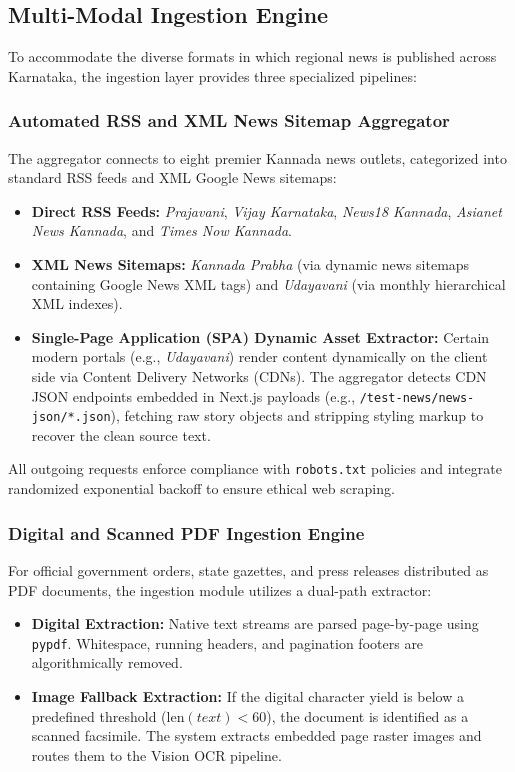 \documentclass[conference]{IEEEtran}
\begin{document}
\subsection{Multi-Modal Ingestion Engine}
To accommodate the diverse formats in which regional news is published across Karnataka, the ingestion layer provides three specialized pipelines:

\subsubsection{Automated RSS and XML News Sitemap Aggregator}
The aggregator connects to eight premier Kannada news outlets, categorized into standard RSS feeds and XML Google News sitemaps:
\begin{itemize}
    \item \textbf{Direct RSS Feeds:} \textit{Prajavani}, \textit{Vijay Karnataka}, \textit{News18 Kannada}, \textit{Asianet News Kannada}, and \textit{Times Now Kannada}.
    \item \textbf{XML News Sitemaps:} \textit{Kannada Prabha} (via dynamic news sitemaps containing Google News XML tags) and \textit{Udayavani} (via monthly hierarchical XML indexes).
    \item \textbf{Single-Page Application (SPA) Dynamic Asset Extractor:} Certain modern portals (e.g., \textit{Udayavani}) render content dynamically on the client side via Content Delivery Networks (CDNs). The aggregator detects CDN JSON endpoints embedded in Next.js payloads (e.g., \texttt{/test-news/news-json/*.json}), fetching raw story objects and stripping styling markup to recover the clean source text.
\end{itemize}
All outgoing requests enforce compliance with \texttt{robots.txt} policies and integrate randomized exponential backoff to ensure ethical web scraping.

\subsubsection{Digital and Scanned PDF Ingestion Engine}
For official government orders, state gazettes, and press releases distributed as PDF documents, the ingestion module utilizes a dual-path extractor:
\begin{itemize}
    \item \textbf{Digital Extraction:} Native text streams are parsed page-by-page using \texttt{pypdf}. Whitespace, running headers, and pagination footers are algorithmically removed.
    \item \textbf{Image Fallback Extraction:} If the digital character yield is below a predefined threshold ($\text{len}(text) < 60$), the document is identified as a scanned facsimile. The system extracts embedded page raster images and routes them to the Vision OCR pipeline.
\end{itemize}
\end{document}
